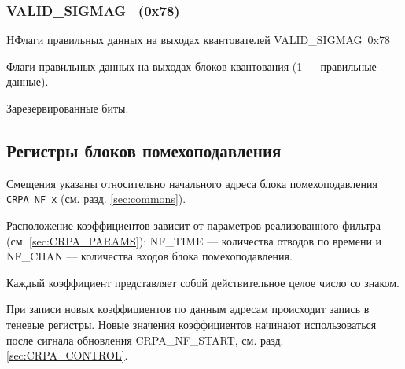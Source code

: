 \subsubsection{VALID\_SIGMAG~ (0x78)}
\renewcommand{\regnam}{VALID\_SIGMAG~}
\label{sec:VALID_SIGMAG}

\begin{register}{H}{Флаги правильных данных на выходах квантователей \regnam}{0x78}

\label{regsamplecount}%
%
%
\regnewline%

\begin{regdesc}\begin{reglist}
\item [VALID\_SIGMAG (rw)]
Флаги правильных данных на выходах блоков квантования (1 --- правильные данные).
\item [Reserved]
Зарезервированные биты.
\end{reglist}\end{regdesc}
\end{register}


\subsection{Регистры блоков помехоподавления}
\label{sec:CRPA_NF}

Смещения указаны относительно начального адреса блока помехоподавления
\texttt{CRPA\_NF\_x} (см. разд. \ref{sec:commons}).

Расположение коэффициентов зависит от параметров реализованного фильтра
(см. \ref{sec:CRPA_PARAMS}): NF\_TIME --- количества отводов по времени и NF\_CHAN ---
количества входов блока помехоподавления.

Каждый коэффициент представляет собой действительное целое число со знаком.

При записи новых коэффициентов по данным адресам происходит запись в теневые
регистры. Новые значения коэффициентов начинают использоваться после сигнала обновления
CRPA\_NF\_START, см. разд. \ref{sec:CRPA_CONTROL}.

